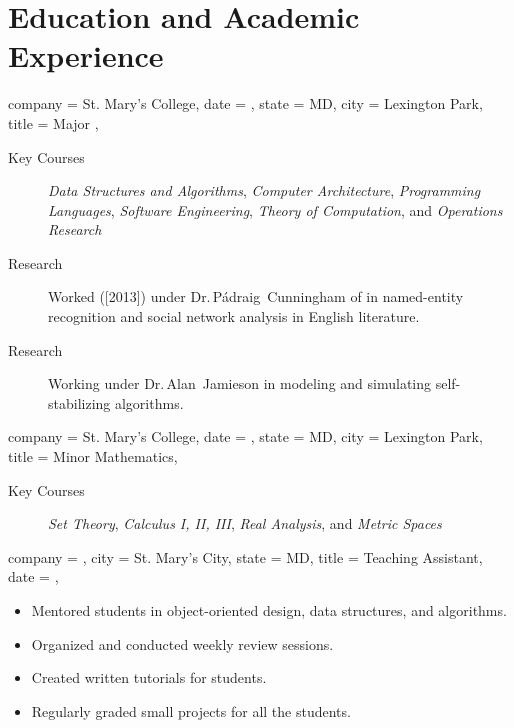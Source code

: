 \documentclass{bettercv}
\newcommand \course[1]   {\textit{#1}}
\begin{document}
\section{Education and Academic Experience}
\begin{position}
  {
    company = St. Mary's College,
    date    = ,
    state   = MD,
    city    = Lexington Park,
    title   = Major ,
  }

\begin{description}
\item[Key Courses]
  \course{Data Structures and Algorithms},
  \course{Computer Architecture},
  \course{Programming Languages},
  \course{Software Engineering},
  \course{Theory of Computation},
  and \course{Operations Research}
\item[Research] Worked ([2013]) under
  Dr.\,P\'adraig~Cunningham of \ucd in named-entity recognition and
  social network analysis in English literature.
\item[Research] Working under Dr.\,Alan~Jamieson in modeling and
  simulating self-stabilizing algorithms.
\end{description}
\end{position}

\begin{position}
  {
    company = St. Mary's College,
    date    = ,
    state   = MD,
    city    = Lexington Park,
    title   = Minor \Dash Mathematics,
  }

  \begin{description}
  \item[Key Courses]
    \course{Set Theory},
    \course{Calculus I, II, III},
    \course{Real Analysis},
    and \course{Metric Spaces}
  \end{description}
\end{position}

\begin{position}
  {
    company = \smcmmathcs,
    city    = St. Mary's City,
    state   = MD,
    title   = Teaching Assistant,
    date    = ,
  }

\begin{itemize}
\item Mentored students in object-oriented design, data structures, and algorithms.
\item Organized and conducted weekly review sessions.
\item Created written tutorials for students.
\item Regularly graded small projects for all the students.
\end{itemize}
\end{position}
\end{document}
